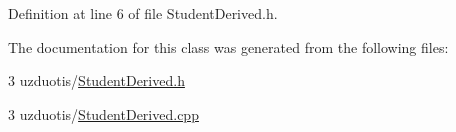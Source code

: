 Definition at line 6 of file Student\+Derived.\+h.



The documentation for this class was generated from the following files\+:\begin{DoxyCompactItemize}
\item 
3 uzduotis/\mbox{\hyperlink{_student_derived_8h}{Student\+Derived.\+h}}\item 
3 uzduotis/\mbox{\hyperlink{_student_derived_8cpp}{Student\+Derived.\+cpp}}\end{DoxyCompactItemize}
